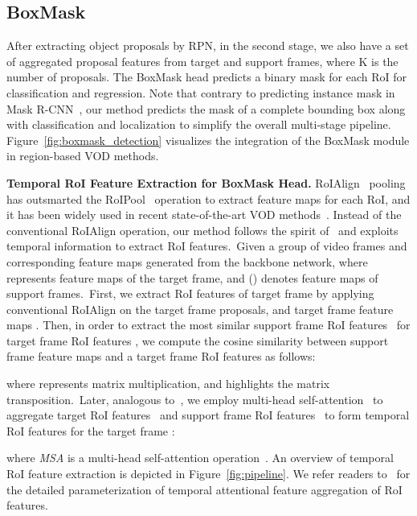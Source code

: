 \documentclass[10pt,twocolumn,letterpaper]{article}
\begin{document}
\subsection{BoxMask}
\label{sec:boxMask}
After extracting object proposals by RPN, in the second stage, we also have a set of aggregated proposal features  from target and support frames, where K is the number of proposals. The BoxMask head predicts a binary mask for each RoI for classification and regression. Note that contrary to predicting instance mask in Mask R-CNN~\cite{he2017mask}, our method predicts the mask of a complete bounding box along with classification and localization to simplify the overall multi-stage pipeline. Figure~\ref{fig:boxmask_detection} visualizes the integration of the BoxMask module in region-based VOD methods.

\vspace{3pt}
\noindent \textbf{Temporal RoI Feature Extraction for BoxMask Head.}
\label{sec:roi_feature}
RoIAlign~\cite{he2017mask} pooling has outsmarted the RoIPool~\cite{girshick2015fast} operation to extract feature maps for each RoI, and it has been widely used in recent state-of-the-art VOD methods~\cite{wu2019sequence, han2020mining}. Instead of the conventional RoIAlign operation, our method follows the spirit of~\cite{gong2021temporal} and exploits temporal information to extract RoI features.~Given a group of video frames  and corresponding feature maps generated from the backbone network, where  represents feature maps of the target frame, and  () denotes feature maps of support frames.~First, we extract RoI features of target frame  by applying conventional RoIAlign on the target frame proposals, and target frame feature maps . Then, in order to extract the most similar support frame RoI features~ for target frame RoI features , we compute the cosine similarity  between support frame feature maps  and a target frame RoI features  as follows:

where  represents matrix multiplication, and  highlights the matrix transposition.~Later, analogous to~\cite{gong2021temporal}, we employ multi-head self-attention~\cite{vaswani2017attention} to aggregate target RoI features~ and support frame RoI features~ to form temporal RoI features for the target frame : 

where \textit{MSA} is a multi-head self-attention operation~\cite{vaswani2017attention}. An overview of temporal RoI feature extraction is depicted in Figure~\ref{fig:pipeline}. We refer readers to~\cite{gong2021temporal} for the detailed parameterization of temporal attentional feature aggregation of RoI features.
\end{document}
